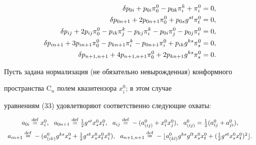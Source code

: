 \begin{align} 


\delta p_{0i}+p_{0i}\pi^0_0-p_{0k}\pi^k_i+\pi^0_i&=0,\notag \\ 


% 


\delta p_{0n+1}+2p_{0n+1}\pi^0_0+p_{0s}g^{s t}\pi^0_t&=0,\notag \\ 


%


\delta p_{i j}+2p_{i j}\pi^0_0-p_{i k}\pi^k_j-p_{k j}\pi^k_i 


-p_{0i}\pi^0_j-p_{0j}\pi^0_i&=0, \\ 


% 


\delta p_{in+1}+3p_{in+1}\pi^0_0-p_{k n +1}\pi^k_i- 


p_{0n+1}\pi^0_i+p_{i k}g^{k s}\pi^0_s&=0,\notag \\ 


%


\delta p_{n+1,n+1}+4p_{n+1,n+1}\pi^0_0+ 


2p_{k n+1}g^{k s}\pi^0_s&=0. \notag


\end{align} 


 


Пусть задана нормализация (не обязательно невырожденная) конформного 


пространства $\mathrm C_n$ полем квазитензора $x^0_i$; в этом случае 


уравнениям (33) удовлетворяют соответственно следующие охваты: 


\begin{equation} 


\begin{array}{c} 


a_{0i}\defeq x^0_i,\ \ a_{0n+1}\defeq \tfrac{1}{2}g^{s t} 


x^0_s x^0_t,\ \ a_{i j}\defeq -(a^0_{(i j)}+x^0_i x^0_j), 


\ \ a^0_{(i j)}=\tfrac{1}{2}(a^0_{i j}+a^0_{j i}),\\[2mm] 


% 


a_{in+1}\defeq -(a^0_{(i k)}g^{k s}x^0_s+\tfrac{1}{2} 


g^{s t}x^0_s x^0_t x^0_i),\ \ a_{n+1,n+1}\defeq -\lfloor a^0_{(k l)} 


g^{k s}g^{l t}x^0_s x^0_t+(\tfrac{1}{2} 


g^{s t}x^0_s x^0_t)^2\rfloor. 


\end{array} 


\end{equation} 


